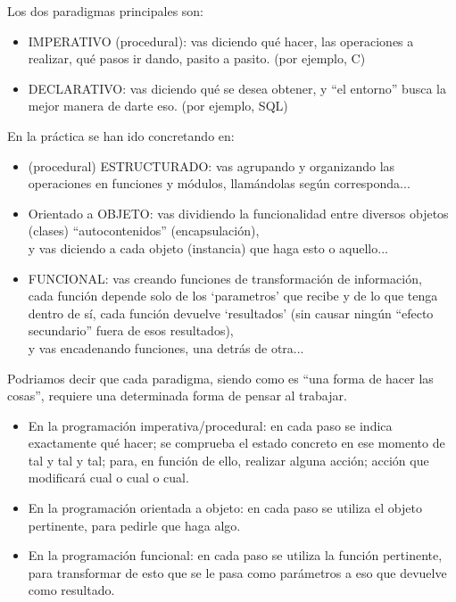 \documentclass[spanish,12pt,a4paper,final,oneside]{book}
\begin{document}
Los dos paradigmas principales son:

\begin{itemize}

\item IMPERATIVO (procedural): vas diciendo qué hacer, las operaciones a realizar, qué pasos ir dando, pasito a pasito. (por ejemplo, C)

\item DECLARATIVO: vas diciendo qué se desea obtener, y ``el entorno'' busca la mejor manera de darte eso. (por ejemplo, SQL)

\end{itemize}

En la práctica se han ido concretando en:

\begin{itemize}

\item (procedural) ESTRUCTURADO: vas agrupando y organizando las operaciones en funciones y módulos, llamándolas según corresponda...

\item Orientado a OBJETO: vas dividiendo la funcionalidad entre diversos objetos (clases) ``autocontenidos'' (encapsulación), 
\\ y vas diciendo a cada objeto (instancia) que haga esto o aquello...
                        
\item FUNCIONAL: vas creando funciones de transformación de información, \\cada función depende solo de los `parametros' que recibe y de lo que tenga dentro de sí, cada función devuelve `resultados' (sin causar ningún ``efecto secundario'' fuera de esos resultados), 
\\y vas encadenando funciones, una detrás de otra...

\end{itemize}


Podriamos decir que cada paradigma, siendo como es ``una forma de hacer las cosas'', requiere una determinada forma de pensar al trabajar. 

\begin{itemize}

\item En la programación imperativa/procedural: en cada paso se indica exactamente qué hacer; se comprueba el estado concreto en ese momento de tal y tal y tal; para, en función de ello, realizar alguna acción; acción que modificará cual o cual o cual.

\item En la programación orientada a objeto: en cada paso se utiliza el objeto pertinente, para pedirle que haga algo.

\item En la programación funcional: en cada paso se utiliza la función pertinente, para transformar de esto que se le pasa como parámetros a eso que devuelve como resultado.

\end{itemize}
\end{document}
